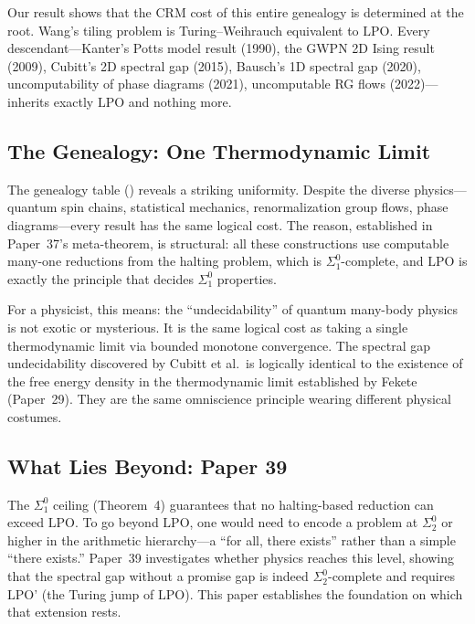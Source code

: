 \documentclass[11pt,a4paper]{article}
\theoremstyle{plain}
\theoremstyle{definition}
\newcommand{\LPO}{\ensuremath{\mathrm{LPO}}}
\begin{document}
Our result shows that the CRM cost of this entire genealogy is
determined at the root.  Wang's tiling problem is
Turing--Weihrauch equivalent to \LPO.  Every descendant---Kanter's
Potts model result (1990), the GWPN 2D Ising result (2009),
Cubitt's 2D spectral gap (2015), Bausch's 1D spectral gap (2020),
uncomputability of phase diagrams (2021), uncomputable RG flows
(2022)---inherits exactly \LPO{} and nothing more.

\subsection{The Genealogy: One Thermodynamic Limit}

The genealogy table () reveals a striking
uniformity.  Despite the diverse physics---quantum spin chains,
statistical mechanics, renormalization group flows, phase
diagrams---every result has the same logical cost.  The reason,
established in Paper~37's meta-theorem, is structural: all these
constructions use computable many-one reductions from the halting
problem, which is $\Sigma_1^0$-complete, and \LPO{} is exactly the
principle that decides $\Sigma_1^0$ properties.

For a physicist, this means: the ``undecidability'' of quantum
many-body physics is not exotic or mysterious.  It is the same
logical cost as taking a single thermodynamic limit via bounded
monotone convergence.  The spectral gap undecidability discovered
by Cubitt et al.\ is logically identical to the existence of the
free energy density in the thermodynamic limit established by Fekete
(Paper~29).  They are the same omniscience principle wearing
different physical costumes.

\subsection{What Lies Beyond: Paper 39}

The $\Sigma_1^0$ ceiling (Theorem~4) guarantees that no halting-based
reduction can exceed \LPO.  To go beyond \LPO, one would need to
encode a problem at $\Sigma_2^0$ or higher in the arithmetic
hierarchy---a ``for all, there exists'' rather than a simple ``there
exists.''  Paper~39 investigates whether physics reaches this level,
showing that the spectral gap without a promise gap is indeed
$\Sigma_2^0$-complete and requires \LPO' (the Turing jump of \LPO).
This paper establishes the foundation on which that extension rests.

\end{document}

